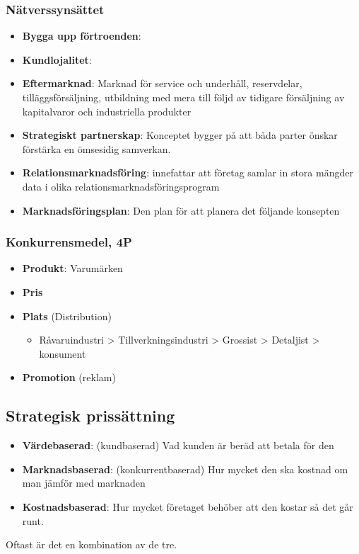 \subsubsection{Nätverssynsättet}
\begin{itemize}
    \item \textbf{Bygga upp förtroenden}:
    \item \textbf{Kundlojalitet}:
    \item \textbf{Eftermarknad}: \newline
    Marknad för service och underhåll, reservdelar, tilläggsförsäljning, utbildning 
    med mera till följd av tidigare försäljning av kapitalvaror och industriella produkter
    \item \textbf{Strategiskt partnerskap}: \newline
    Konceptet bygger på att båda parter önskar förstärka en ömsesidig samverkan.
    \item \textbf{Relationsmarknadsföring}: \newline
    innefattar att företag samlar in stora mängder data i olika 
    relationsmarknadsföringsprogram
    \item \textbf{Marknadsföringsplan}: \newline
    Den plan för att planera det följande konsepten
\end{itemize}

\subsubsection{Konkurrensmedel, 4P}
\begin{itemize}
    \item \textbf{Produkt}: Varumärken
    \item \textbf{Pris} 
    \item \textbf{Plats} (Distribution)
    \begin{itemize}
        \item Råvaruindustri > Tillverkningsindustri > Grossist > Detaljist > konsument
    \end{itemize}
    \item \textbf{Promotion} (reklam)
\end{itemize}

\subsection{Strategisk prissättning}
\begin{itemize}
    \item \textbf{Värdebaserad}: (kundbaserad) \newline
    Vad kunden är beräd att betala för den
    \item \textbf{Marknadsbaserad}: (konkurrentbaserad) \newline
    Hur mycket den ska kostnad om man jämför med marknaden
    \item \textbf{Kostnadsbaserad}: \newline
    Hur mycket företaget behöber att den kostar så det går runt.
\end{itemize}
Oftast är det en kombination av de tre.

